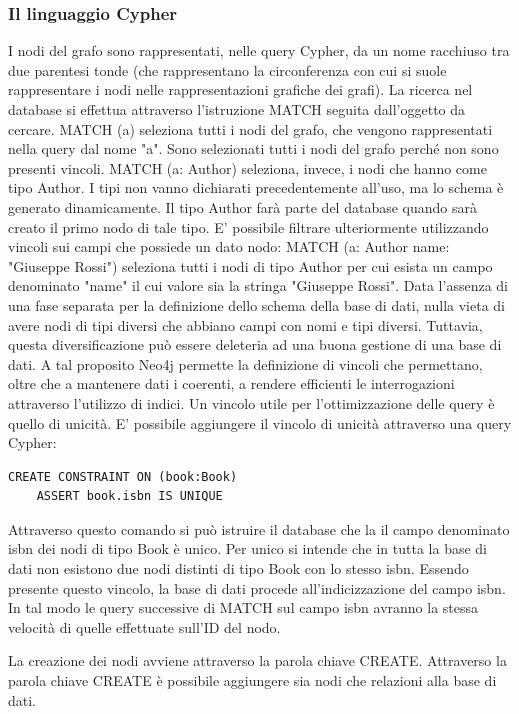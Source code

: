 \documentclass[a4paper, 12pt]{article}
\begin{document}
\subsubsection{Il linguaggio Cypher}
I nodi del grafo sono rappresentati, nelle query Cypher, da un nome racchiuso tra due parentesi tonde (che rappresentano la circonferenza con cui si suole rappresentare i nodi nelle rappresentazioni grafiche dei grafi). La ricerca nel database si effettua attraverso l'istruzione MATCH seguita dall'oggetto da cercare.
MATCH (a) seleziona tutti i nodi del grafo, che vengono rappresentati nella query dal nome "a". Sono selezionati tutti i nodi del grafo perché non sono presenti vincoli.
MATCH (a: Author) seleziona, invece, i nodi che hanno come tipo Author. I tipi non vanno dichiarati precedentemente all'uso, ma lo schema è generato dinamicamente. Il tipo Author farà parte del database quando sarà creato il primo nodo di tale tipo.
E' possibile filtrare ulteriormente utilizzando vincoli sui campi che possiede un dato nodo:
MATCH (a: Author {name: "Giuseppe Rossi"}) seleziona tutti i nodi di tipo Author per cui esista un campo denominato "name" il cui valore sia la stringa "Giuseppe Rossi". Data l'assenza di una fase separata per la definizione dello schema della base di dati, nulla vieta di avere nodi di tipi diversi che abbiano campi con nomi e tipi diversi. Tuttavia, questa diversificazione può essere deleteria ad una buona gestione di una base di dati. A tal proposito Neo4j permette la definizione di vincoli che permettano, oltre che a mantenere dati i coerenti, a rendere efficienti le interrogazioni attraverso l'utilizzo di indici.
Un vincolo utile per l'ottimizzazione delle query è quello di unicità. E' possibile aggiungere il vincolo di unicità attraverso una query Cypher:
\begin{lstlisting}[keepspaces=true]
  CREATE CONSTRAINT ON (book:Book)
    ASSERT book.isbn IS UNIQUE
\end{lstlisting}
Attraverso questo comando si può istruire il database che la il campo denominato isbn dei nodi di tipo Book è unico. Per unico si intende che in tutta la base di dati non esistono due nodi distinti di tipo Book con lo stesso isbn. Essendo presente questo vincolo, la base di dati procede all'indicizzazione del campo isbn. In tal modo le query successive di MATCH sul campo isbn avranno la stessa velocità di quelle effettuate sull'ID del nodo.
\par
La creazione dei nodi avviene attraverso la parola chiave CREATE. Attraverso la parola chiave CREATE è possibile aggiungere sia nodi che relazioni alla base di dati. \\
\end{document}
